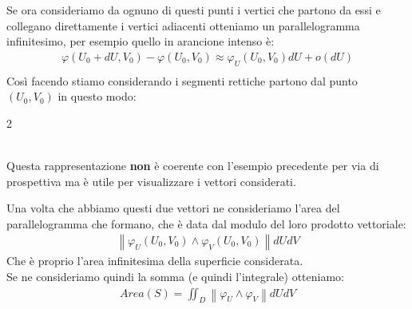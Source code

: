 \documentclass[a4paper, oneside]{article}
\begin{document}
Se ora consideriamo da ognuno di questi punti i vertici che partono da essi e collegano direttamente i vertici adiacenti otteniamo un parallelogramma infinitesimo, per esempio quello in arancione intenso è:
\begin{gather*}
  \varphi(U_0 + dU,V_0) - \varphi(U_0,V_0) \approx \varphi_U (U_0,V_0) dU + o(dU)\\
\end{gather*}
Così facendo stiamo considerando i segmenti rettiche partono dal punto $(U_0,V_0)$ in questo modo:
  \begin{multicols}{2}
    \noindent
    \begin{center}
    \end{center}
    \columnbreak
    \hfill\\
    \scriptsize Questa rappresentazione \textbf{non} è coerente con l'esempio precedente per via di prospettiva ma è utile per visualizzare i vettori considerati. \normalsize\\
  \end{multicols}
Una volta che abbiamo questi due vettori ne consideriamo l'area del parallelogramma che formano, che è data dal modulo del loro prodotto vettoriale:
\begin{gather*}
  \left\lVert \varphi_U (U_0, V_0) \land \varphi_V (U_0 , V_0) \right\rVert dU dV 
\end{gather*}
Che è proprio l'area infinitesima della superficie considerata.\\
Se ne consideriamo quindi la somma (e quindi l'integrale) otteniamo:
\begin{gather*}
  Area(S) = \iint_D \left\lVert \varphi_U \land \varphi_V \right\rVert dUdV
\end{gather*}
\end{document}
